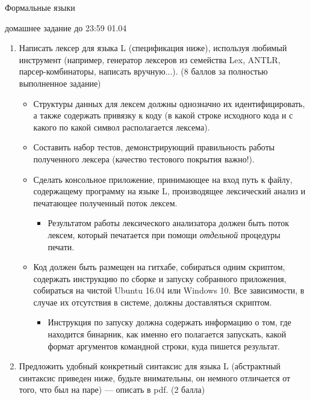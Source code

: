 \documentclass{article}
\begin{document}
\begin{center} {\LARGE Формальные языки} \end{center}

\begin{center} {\Large домашнее задание до 23:59 01.04} \end{center}
\bigskip

\begin{enumerate}
  \item Написать лексер для языка L (спецификация ниже), используя любимый инструмент (например, генератор лексеров из семейства Lex, ANTLR, парсер-комбинаторы, написать вручную...). (8 баллов за полностью выполненное задание)
    \begin{itemize}
        \item Структуры данных для лексем должны однозначно их идентифицировать, а также содержать привязку к коду (в какой строке исходного кода и с какого по какой символ располагается лексема). 
        \item Составить набор тестов, демонстрирующий правильность работы полученного лексера (качество тестового покрытия важно!).
        \item Сделать консольное  приложение, принимающее на вход путь к файлу, содержащему программу на языке L, производящее лексический анализ и печатающее полученный поток лексем.
        \begin{itemize}
            \item Результатом работы лексического анализатора должен быть поток лексем, который печатается при помощи \emph{отдельной} процедуры печати. 
        \end{itemize}
        \item Код должен быть размещен на гитхабе, собираться одним скриптом, содержать инструкцию по сборке и запуску собранного приложения, собираться на чистой Ubuntu 16.04 или Windows 10. Все зависимости, в случае их отсутствия в системе, должны доставляться скриптом.
        \begin{itemize}
            \item Инструкция по запуску должна содержать информацию о том, где находится бинарник, как именно его полагается запускать, какой формат аргументов командной строки, куда пишется результат.
        \end{itemize} 
     \end{itemize}
  \item Предложить удобный конкретный синтаксис для языка L (абстрактный синтаксис приведен ниже, будьте внимательны, он немного отличается от того, что был на паре) --- описать в pdf. (2 балла)

\end{enumerate}
\end{document}
